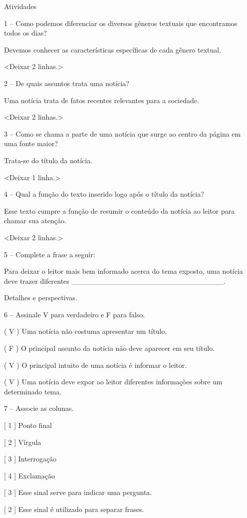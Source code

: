 Atividades

1 -- Como podemos diferenciar os diversos gêneros textuais que
encontramos todos os dias?

Devemos conhecer as características específicas de cada gênero textual.

\textless{}Deixar 2 linhas.\textgreater{}

2 -- De quais assuntos trata uma notícia?

Uma notícia trata de fatos recentes relevantes para a sociedade.

\textless{}Deixar 2 linhas.\textgreater{}

3 -- Como se chama a parte de uma notícia que surge ao centro da página
em uma fonte maior?

Trata-se do título da notícia.

\textless{}Deixar 1 linha.\textgreater{}

4 -- Qual a função do texto inserido logo após o título da notícia?

Esse texto cumpre a função de resumir o conteúdo da notícia ao leitor
para chamar sua atenção.

\textless{}Deixar 2 linhas.\textgreater{}

5 -- Complete a frase a seguir:

Para deixar o leitor mais bem informado acerca do tema exposto, uma
notícia deve trazer diferentes
\_\_\_\_\_\_\_\_\_\_\_\_\_\_\_\_\_\_\_\_\_\_\_\_\_\_\_\_\_.

Detalhes e perspectivas.

6 -- Assinale V para verdadeiro e F para falso.

( V ) Uma notícia não costuma apresentar um título.

( F ) O principal assunto da notícia não deve aparecer em seu título.

( V ) O principal intuito de uma notícia é informar o leitor.

( V ) Uma notícia deve expor ao leitor diferentes informações sobre um
determinado tema.

7 -- Associe as colunas.

{[} 1 {]} Ponto final

{[} 2 {]} Vírgula

{[} 3 {]} Interrogação

{[} 4 {]} Exclamação

{[} 3 {]} Esse sinal serve para indicar uma pergunta.

{[} 2 {]} Esse sinal é utilizado para separar frases.

